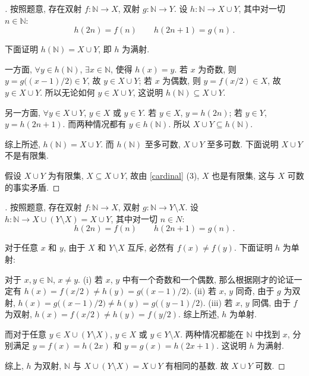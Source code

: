 \documentclass[UTF8]{ctexart}
\theoremstyle{mystyle}
\theoremstyle{myremark}
\theoremstyle{plain}
\newcommand{\N}{\mathbb N}
\begin{document}
\begin{proof}[]
    按照题意, 存在双射 $ f \colon \N \to X $, 双射 $ g \colon \N \to Y $. 设 $ h \colon \N \to X \cup Y $, 其中对一切 $ n \in \N $:
    \[ h(2 n) = f(n) \qquad h(2n + 1) = g(n) \,.\]

    下面证明 $ h (\N) = X \cup Y $, 即 $ h $ 为满射.

    一方面, $ \forall y \in h(\N) $, $ \exists x \in \N $, 使得 $ h(x) = y $. 若 $ x $ 为奇数, 则 $ y = g \big( (x - 1) / 2 \big) \in Y $, 故 $ y \in X \cup Y $; 若 $ x $ 为偶数, 则 $ y = f (x / 2) \in X $, 故 $ y \in X \cup Y $. 所以无论如何 $ y \in X \cup Y $, 这说明 $ h(\N) \subseteq X \cup Y $.

    另一方面, $ \forall y \in X \cup Y $, $ y \in X $ 或 $ y \in Y $. 若 $ y \in X $, $ y = h(2n) $; 若 $ y \in Y $, $ y = h (2n+1) $. 而两种情况都有 $ y \in h(\N) $. 所以 $ X \cup Y \subseteq h(\N) $.

    综上所述, $ h(\N) = X \cup Y $. 而 $ h(\N) $ 至多可数, $ X \cup Y $ 至多可数. 下面说明 $ X \cup Y $ 不是有限集.

    假设 $ X \cup Y $ 为有限集, $ X \subseteq X \cup Y $, 故由 \ref{cardinal} (3), $ X $ 也是有限集, 这与 $ X $ 可数的事实矛盾.
\end{proof}

\begin{proof}[]
    按照题意, 存在双射 $ f \colon \N \to X $, 双射 $ g \colon \N \to Y \setminus X $. 设 $ h \colon \N \to X \cup (Y \setminus X) = X \cup Y $, 其中对一切 $ n \in N $:
    \[ h(2 n) = f(n) \qquad h(2n + 1) = g(n) \,.\]

    对于任意 $ x $ 和 $ y $, 由于 $ X $ 和 $ Y \setminus X $ 互斥, 必然有 $ f(x) \neq f(y) $. 下面证明 $ h $ 为单射:

    对于 $ x, y \in \N $, $ x \neq y $. (i) 若 $ x $, $ y $ 中有一个奇数和一个偶数, 那么根据刚才的论证一定有 $ h(x) = f(x / 2) \neq h(y) = g \big( (x - 1)/2 \big) $. (ii) 若 $ x $, $ y $ 同奇, 由于 $ g $ 为双射, $ h(x) = g \big( (x - 1) / 2 \big) \neq h(y) = g \big( (y - 1) / 2 \big) $. (iii) 若 $ x $, $ y $ 同偶, 由于 $ f $ 为双射, $ h(x) = f(x / 2) \neq h(y) = f(y / 2) $. 综上所述, $ h $ 为单射.

    而对于任意 $ y \in X \cup (Y \setminus X) $, $ y \in X $ 或 $ y \in Y \setminus X $. 两种情况都能在 $ \N $ 中找到 $ x $, 分别满足 $ y = f(x) = h(2x) $ 和 $ y = g(x) = h(2x + 1) $. 这说明 $ h $ 为满射.

    综上, $ h $ 为双射, $ \N $ 与 $ X \cup (Y \setminus X) = X \cup Y $ 有相同的基数. 故 $ X \cup Y $ 可数.
\end{proof}
\end{document}
